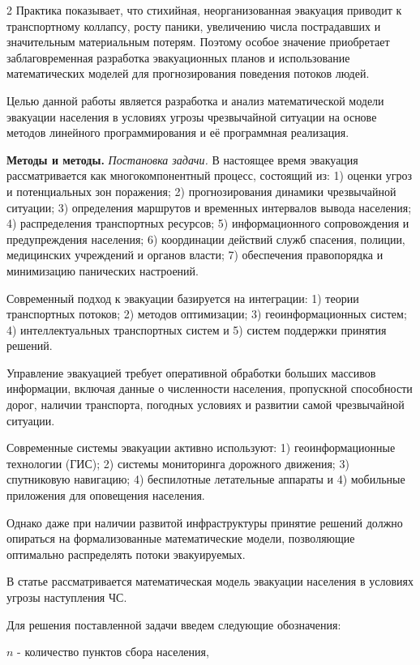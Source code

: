 \begin{multicols}{2}
Практика показывает, что стихийная, неорганизованная эвакуация приводит
к транспортному коллапсу, росту паники, увеличению числа пострадавших и
значительным материальным потерям. Поэтому особое значение приобретает
заблаговременная разработка эвакуационных планов и использование
математических моделей для прогнозирования поведения потоков людей.

Целью данной работы является разработка и анализ математической модели
эвакуации населения в условиях угрозы чрезвычайной ситуации на основе
методов линейного программирования и её программная реализация.

{\bfseries Методы и методы.} \emph{Постановка задачи.} В настоящее время
эвакуация рассматривается как многокомпонентный процесс, состоящий из:
1) оценки угроз и потенциальных зон поражения; 2) прогнозирования
динамики чрезвычайной ситуации; 3) определения маршрутов и временных
интервалов вывода населения; 4) распределения транспортных ресурсов; 5)
информационного сопровождения и предупреждения населения; 6) координации
действий служб спасения, полиции, медицинских учреждений и органов
власти; 7) обеспечения правопорядка и минимизацию панических настроений.

Современный подход к эвакуации базируется на интеграции: 1) теории
транспортных потоков; 2) методов оптимизации; 3) геоинформационных
систем; 4) интеллектуальных транспортных систем и 5) систем поддержки
принятия решений.

Управление эвакуацией требует оперативной обработки больших массивов
информации, включая данные о численности населения, пропускной
способности дорог, наличии транспорта, погодных условиях и развитии
самой чрезвычайной ситуации.

Современные системы эвакуации активно используют: 1) геоинформационные
технологии (ГИС); 2) системы мониторинга дорожного движения; 3)
спутниковую навигацию; 4) беспилотные летательные аппараты и 4)
мобильные приложения для оповещения населения.

Однако даже при наличии развитой инфраструктуры принятие решений должно
опираться на формализованные математические модели, позволяющие
оптимально распределять потоки эвакуируемых.

В статье рассматривается математическая модель эвакуации населения в
условиях угрозы наступления ЧС.

Для решения поставленной задачи введем следующие обозначения:

\(n\) - количество пунктов сбора населения,


\end{multicols}
